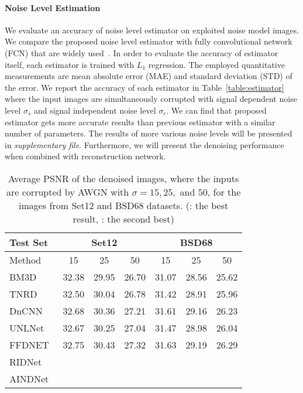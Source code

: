 \documentclass[10pt,twocolumn,letterpaper]{article}
\begin{document}
\paragraph{Noise Level Estimation} 
We evaluate an accuracy of noise level estimator on exploited noise model images.
We compare the proposed noise level estimator with fully convolutional network (FCN) that are widely used~\cite{guo2019toward,brooks2019unprocessing}.
In order to evaluate the accuracy of estimator itself, each estimator is trained with $L_1$ regression.
The employed quantitative measurements are mean absolute error (MAE) and standard deviation (STD) of the error.
We report the accuracy of each estimator in Table~\ref{table:estimator} where the input images are simultaneously corrupted with signal dependent noise level $\sigma_s$ and signal independent noise level $\sigma_c$.
We can find that proposed estimator gets more accurate results than previous estimator with a similar number of parameters.
The results of more various noise levels will be presented in \textit{supplementary file}.
Furthermore, we will present the denoising performance when combined with reconstruction network.  
\begin{table}[]
	\centering
	\caption{Average PSNR of the denoised images, where the inputs are corrupted by AWGN with $\sigma = 15, 25,$ and $50$, for the images from Set12 and BSD68 datasets. (\color{red}{red}: \color{black} the best result, \color{blue}{blue}: \color{black} the second best)}
	\label{table:AWGN}
	\begin{adjustbox}{width = 0.85\linewidth }
		\begin{tabular}{l|ccc|ccc}
			\toprule
			Test Set     & \multicolumn{3}{c|}{Set12} & \multicolumn{3}{c}{BSD68} \\
			\hline 
			Method   & 15      & 25     & 50     & 15      & 25     & 50     \\
			\hline \hline
			BM3D~\cite{dabov2007color}    & 32.38   & 29.95  & 26.70  & 31.07   & 28.56  & 25.62  \\
			TNRD~\cite{chen2016trainable}    & 32.50   & 30.04  & 26.78  & 31.42   & 28.91  & 25.96  \\
			DnCNN~\cite{zhang2017beyond}  & 32.68   & 30.36  & 27.21  & 31.61   & 29.16  & 26.23  \\
			UNLNet~\cite{lefkimmiatis2018universal}  & 32.67   & 30.25  & 27.04  & 31.47   & 28.98  & 26.04  \\
			FFDNET~\cite{zhang2018ffdnet}  & 32.75   & 30.43  & 27.32  & 31.63   & 29.19  & 26.29  \\
			RIDNet~\cite{Anwar_2019_ICCV}  & \color{blue}{32.91}   & \color{blue}{30.60}  & \color{blue}{27.43}  & \color{red}{31.81}   & \color{red}{29.34}  & \color{red}{26.40}  \\
			AINDNet & \color{red}{32.92}   & \color{red}{30.61}  & \color{red}{27.51}  & \color{blue}{31.69}   & \color{blue}{29.26}  & \color{blue}{26.32}  \\		
			\bottomrule
		\end{tabular}
	\end{adjustbox}
\end{table}
\end{document}
